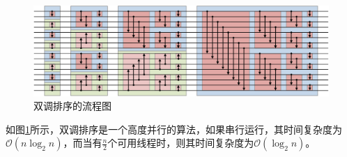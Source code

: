 \documentclass[UTF8,a4paper,10pt]{ctexart}
\makeatletter
\newenvironment{breakablealgorithm}
  {%
  \begin{center}
     \refstepcounter{algorithm}%
     \hrule height.8pt depth0pt \kern2pt%
     \renewcommand{\caption}[2][\relax]{%
      {\raggedright\textbf{\ALG@name~\thealgorithm} ##2\par}%
      \ifx\relax##1\relax %
         \addcontentsline{loa}{algorithm}{\protect\numberline{\thealgorithm}##2}%
      \else %
         \addcontentsline{loa}{algorithm}{\protect\numberline{\thealgorithm}##1}%
      \fi
      \kern2pt\hrule\kern2pt
     }
  }{%
     \kern2pt\hrule\relax%
  \end{center}
  }
\makeatother
\begin{document}
\begin{figure}[!htbp]
    \centering
    \includegraphics[width=5in]{fig/1280px-BitonicSort1.svg.png}
    \caption{双调排序的流程图\cite{bitonic_wiki}}
    \label{fig:bitonic}
\end{figure}

如图\ref{fig:bitonic}所示，双调排序是一个高度并行的算法，如果串行运行，其时间复杂度为$\mathcal{O}(n\log_{2}{n})$，而当有$\frac{n}{2}$个可用线程时，则其时间复杂度为$\mathcal{O}(\log_{2}{n})$。\cite{bitonic_wiki}



\end{document}
